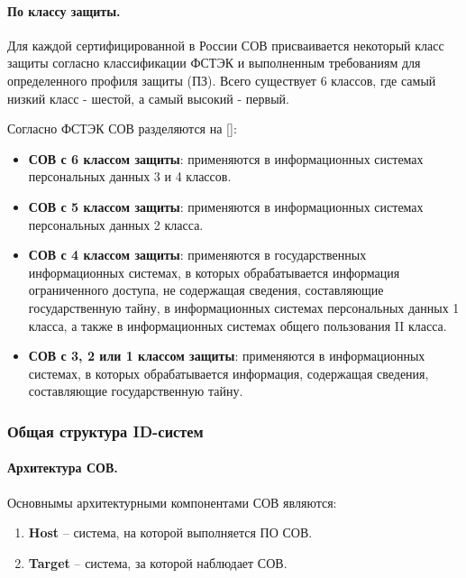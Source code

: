 \paragraph*{По классу защиты.}

Для каждой сертифицированной в России СОВ присваивается некоторый класс защиты 
согласно классификации ФСТЭК и выполненным требованиям для определенного профиля защиты (ПЗ).
Всего существует 6 классов, где самый низкий класс - шестой, а самый высокий - первый.

Согласно ФСТЭК СОВ разделяются на [\cite{IDSFSTEK}]:
\begin{itemize}
	\item \textbf{СОВ с 6 классом защиты}: применяются в информационных системах 
	персональных данных 3 и 4 классов.

	\item \textbf{СОВ с 5 классом защиты}: применяются в информационных системах 
	персональных данных 2 класса.

	\item \textbf{СОВ с 4 классом защиты}: применяются в государственных информационных 
	системах, в которых обрабатывается информация ограниченного доступа, не содержащая 
	сведения, составляющие государственную тайну, в информационных системах персональных 
	данных 1 класса, а также в информационных системах общего пользования II класса.

	\item \textbf{СОВ с 3, 2 или 1 классом защиты}: применяются в информационных системах, 
	в которых обрабатывается информация, содержащая сведения, составляющие государственную 
	тайну.
\end{itemize}



\subsubsection{Общая структура ID-систем} 


\paragraph*{Архитектура СОВ.} Основнымы архитектурными компонентами СОВ являются: 

\begin{enumerate}
	\item \textbf{Host} -- система, на которой выполняется ПО СОВ.
	
	\item \textbf{Target} -- система, за которой наблюдает СОВ.
\end{enumerate}

